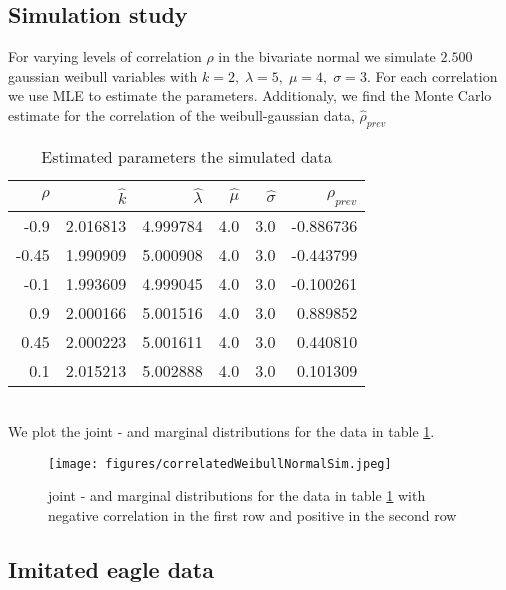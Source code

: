 \subsection{Simulation study}
For varying levels of correlation $\rho$ in the bivariate normal we simulate $2.500$ gaussian weibull variables with $k=2, \; \lambda = 5, \; \mu = 4, \; \sigma = 3$. For each correlation we use MLE to estimate the parameters. Additionaly, we find the Monte Carlo estimate for the correlation of the weibull-gaussian data, $\hat{\rho}_{prev}$
\begin{table}[ht]
    \centering
    \begin{tabular}{rrrrrr}
          \hline
          $\rho$ & $\hat{k}$ & $\hat{\lambda}$ & $\hat{\mu}$ & $\hat{\sigma}$ & $\hat{\rho}_{prev}$\\ 
          \hline
        -0.9 & 2.016813 & 4.999784 & 4.0 & 3.0 & -0.886736 \\ 
          -0.45 & 1.990909 & 5.000908 & 4.0& 3.0 & -0.443799 \\ 
          -0.1 & 1.993609 & 4.999045 & 4.0 & 3.0 & -0.100261 \\ 
          0.9 & 2.000166 & 5.001516 & 4.0 & 3.0 & 0.889852 \\ 
          0.45 & 2.000223 & 5.001611 & 4.0 & 3.0 & 0.440810 \\ 
          0.1 & 2.015213 & 5.002888 & 4.0 & 3.0 & 0.101309 \\ 
           \hline
        \end{tabular}
    \caption{Estimated parameters the simulated data}
    \label{correlationTable}
\end{table}\\
We plot the joint - and marginal distributions for the data in table \ref{correlationTable}.
\begin{figure}[h!]
        \begin{center}
        \texttt{[image: figures/correlatedWeibullNormalSim.jpeg]}
        \caption{joint - and marginal distributions for the data in table \ref{correlationTable} with negative correlation in the first row and positive in the second row}
    \end{center}
\end{figure}

\subsection{Imitated eagle data}
\newpage
